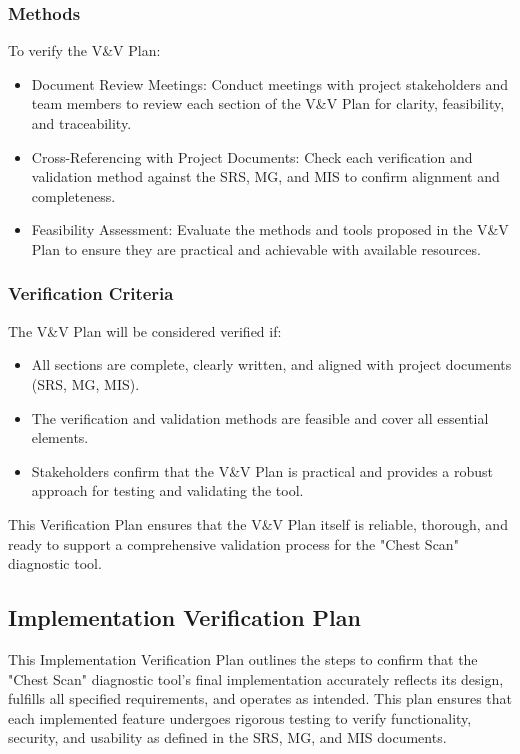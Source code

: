\documentclass[12pt, titlepage]{article}
\begin{document}
\subsubsection{Methods}
To verify the V\&V Plan:
\begin{itemize}
  \item Document Review Meetings: Conduct meetings with project stakeholders and team members to review each section of the V\&V Plan for clarity, feasibility, and traceability.
  \item Cross-Referencing with Project Documents: Check each verification and validation method against the SRS, MG, and MIS to confirm alignment and completeness.
  \item Feasibility Assessment: Evaluate the methods and tools proposed in the V\&V Plan to ensure they are practical and achievable with available resources.
\end{itemize}

\subsubsection{Verification Criteria}
The V\&V Plan will be considered verified if:
\begin{itemize}
  \item All sections are complete, clearly written, and aligned with project documents (SRS, MG, MIS).
  \item The verification and validation methods are feasible and cover all essential elements.
  \item Stakeholders confirm that the V\&V Plan is practical and provides a robust approach for testing and validating the tool.
\end{itemize}
This Verification Plan ensures that the V\&V Plan itself is reliable, thorough, and ready to support a comprehensive validation process for the "Chest Scan" diagnostic tool.

\subsection{Implementation Verification Plan}
This Implementation Verification Plan outlines the steps to confirm that the "Chest Scan" diagnostic tool’s final implementation accurately reflects its design, fulfills all specified requirements, and operates as intended. This plan ensures that each implemented feature undergoes rigorous testing to verify functionality, security, and usability as defined in the SRS, MG, and MIS documents.
\end{document}
